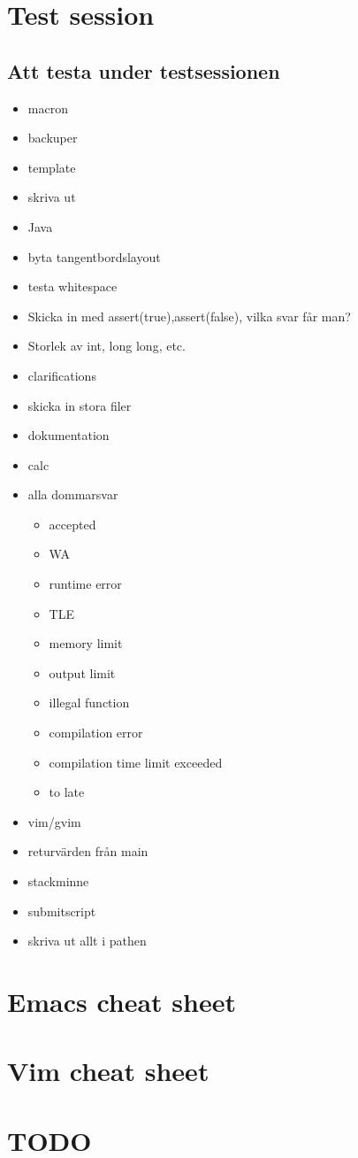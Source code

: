 
\appendix

\chapter{Test session}

\section{Att testa under testsessionen}
\begin{itemize}
	\item macron
	\item backuper
	\item template
	\item skriva ut
	\item Java
	\item byta tangentbordslayout
	\item testa whitespace
	\item Skicka in med assert(true),assert(false), vilka svar får man?
	\item Storlek av int, long long, etc.
	\item clarifications
	\item skicka in stora filer
	\item dokumentation
	\item calc
	\item alla dommarsvar
	\begin{itemize}
 			\item accepted
 			\item WA
 			\item runtime error
 			\item TLE
 			\item memory limit
 			\item output limit
 			\item illegal function
 			\item compilation error
 			\item compilation time limit exceeded
 			\item to late
		\end{itemize}
	\item vim/gvim
	\item returvärden från main
	\item stackminne
	\item submitscript
	\item skriva ut allt i pathen
\end{itemize}

\chapter{Emacs cheat sheet}

\chapter{Vim cheat sheet}

\chapter{TODO}
